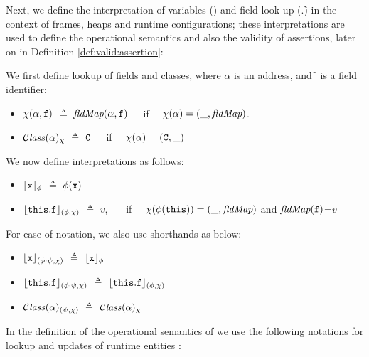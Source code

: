 Next, we define the interpretation of variables (\x) and   field look up  (\this.\f)
in the context of frames,
heaps and runtime configurations; these interpretations are used to define the operational semantics and  also  the
validity of assertions, later on in Definition \ref{def:valid:assertion}:

\begin{definition}[Interpretations]
We first define lookup of fields and classes, where $\alpha$ is an address, and \f\, is a field identifier:
\begin{itemize}
\item
$\chi ({\alpha},{{\mbox{\tt{f}}}})$ $\triangleq$  $\textit{fldMap}({\alpha},{{\mbox{\tt{f}}}})$\ \ \ if \ \ $\chi(\alpha)=(\_, \textit{fldMap})$.
\item
${\mathcal C}{\mathit{lass}}(\alpha)_{\chi} $ $\triangleq$ ${\mbox{\tt{C}}}$\  \ \ if \ \ $\chi(\alpha)=({\mbox{\tt{C}}},\_)$
\end{itemize}

\noindent
We now define interpretations  as follows:

\begin{itemize}
\item
${\lfloor{ {{\mbox{\tt{x}}}}}\rfloor_{\phi}} $ $\triangleq$ $\phi({\mbox{\tt{x}}})$
\item
${\lfloor{ {{\mbox{\tt{this}}}.{\mbox{\tt{f}}}}}\rfloor_{(\phi,\chi)}} $ $\triangleq$ $v$, \ \ \ if \ \ $\chi(\phi({\mbox{\tt{this}}}))=(\_, \textit{fldMap})$ and $\textit{fldMap}({\mbox{\tt{f}}})$=$v$

\end{itemize}

\noindent
For ease of notation, we also use shorthands as below:
\begin{itemize}
\item
${\lfloor{ {{\mbox{\tt{x}}}}}\rfloor_{(\phi\cdot\psi,\chi)}} $ $\triangleq$ ${\lfloor{ {{\mbox{\tt{x}}}}}\rfloor_{\phi}} $
\item
${\lfloor{ {{\mbox{\tt{this}}}.{\mbox{\tt{f}}}}}\rfloor_{(\phi\cdot\psi,\chi)}} $ $\triangleq$ ${\lfloor{ {{\mbox{\tt{this}}}.{\mbox{\tt{f}}}}}\rfloor_{(\phi,\chi)}} $
\item
${\mathcal C}{\mathit{lass}}(\alpha)_{(\psi,\chi)} $ $\triangleq$ ${\mathcal C}{\mathit{lass}}(\alpha)_{\chi} $
\end{itemize}

\end{definition}

In the definition of the operational semantics of \LangOO we use the following notations for lookup and updates of runtime entities :

